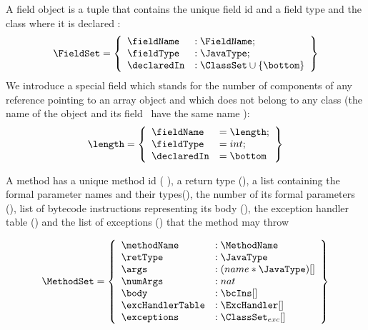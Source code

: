  A field object is a tuple that contains the unique field id and a field type and the class where it is declared :  
 $$ \begin{array}{l}
                                     \FieldSet = \left\{\begin{array}{ll}  \fieldName  &  : \FieldName;\\
                                                                          \fieldType   &  : \JavaType; \\
									  \declaredIn  &  : \ClassSet \cup \{ \bottom \}
                     \end{array} \right\}
   \end{array} $$
 We introduce a special field which stands for the number of components of any reference pointing to an array object and which does not belong to any class
 (the name of the object and its field  \fieldName \ have the same name ):
 $$  \length =  \left\{\begin{array}{ll} \fieldName & = \length;\\
			                 \fieldType  & = int; \\
					 \declaredIn & = \bottom
                     \end{array} \right\}$$
 

 A method has a unique method id ( \methodName), a return type (\retType),
 a list containing the formal parameter names and their types(\args), 
 the number of its formal parameters (\numArgs),
 list of bytecode instructions representing its body (\body),
 the exception handler table (\excHandlerTable) and the list of exceptions
 (\exceptions) that the method may throw

 $$ \begin{array}{l} %
                     \MethodSet  = \left\{\begin{array}{ll}  \methodName & :\MethodName\\
						          \retType & :\JavaType\\
							  \args &  : (name * \JavaType) [] \\
							  \numArgs & : nat \\
							  \body &  : \bcIns [] \\
							  \excHandlerTable & : \ExcHandler []\\
							  \exceptions & : \ClassSet_{exc}[]
                                     \end{array}  \right\}
     \end{array} $$
  
